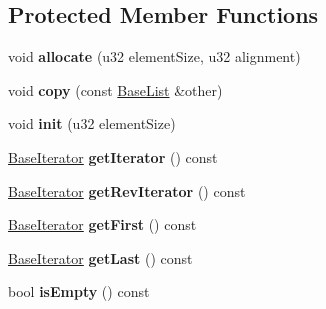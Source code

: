 \subsection*{Protected Member Functions}
\begin{DoxyCompactItemize}
\item 
void {\bfseries allocate} (u32 element\+Size, u32 alignment)\hypertarget{classDE_1_1BaseList_a1af33f5611e6672bfba3a759004fa80e}{}\label{classDE_1_1BaseList_a1af33f5611e6672bfba3a759004fa80e}

\item 
void {\bfseries copy} (const \hyperlink{classDE_1_1BaseList}{Base\+List} \&other)\hypertarget{classDE_1_1BaseList_a3c678d1a2f536c642abe5a7dd800cc79}{}\label{classDE_1_1BaseList_a3c678d1a2f536c642abe5a7dd800cc79}

\item 
void {\bfseries init} (u32 element\+Size)\hypertarget{classDE_1_1BaseList_af61aef7cba6bac35ea183e0f33f114fa}{}\label{classDE_1_1BaseList_af61aef7cba6bac35ea183e0f33f114fa}

\item 
\hyperlink{classDE_1_1BaseList_1_1BaseIterator}{Base\+Iterator} {\bfseries get\+Iterator} () const \hypertarget{classDE_1_1BaseList_ad3f52d9aeab85bad232394ad0809cc40}{}\label{classDE_1_1BaseList_ad3f52d9aeab85bad232394ad0809cc40}

\item 
\hyperlink{classDE_1_1BaseList_1_1BaseIterator}{Base\+Iterator} {\bfseries get\+Rev\+Iterator} () const \hypertarget{classDE_1_1BaseList_a41028ea5b53c8f9229d2b0e127fbbb9c}{}\label{classDE_1_1BaseList_a41028ea5b53c8f9229d2b0e127fbbb9c}

\item 
\hyperlink{classDE_1_1BaseList_1_1BaseIterator}{Base\+Iterator} {\bfseries get\+First} () const \hypertarget{classDE_1_1BaseList_a9cdf4d25a7e575ca5e8398c6c58ddb18}{}\label{classDE_1_1BaseList_a9cdf4d25a7e575ca5e8398c6c58ddb18}

\item 
\hyperlink{classDE_1_1BaseList_1_1BaseIterator}{Base\+Iterator} {\bfseries get\+Last} () const \hypertarget{classDE_1_1BaseList_af797b5d09fab2c05ca9cab7bb7f1db32}{}\label{classDE_1_1BaseList_af797b5d09fab2c05ca9cab7bb7f1db32}

\item 
bool {\bfseries is\+Empty} () const \hypertarget{classDE_1_1BaseList_aad916f630075cf2df2501e98ebfa23de}{}\label{classDE_1_1BaseList_aad916f630075cf2df2501e98ebfa23de}


\end{DoxyCompactItemize}
